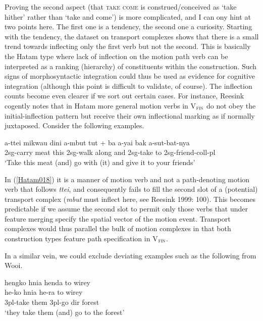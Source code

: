 Proving the second aspect (that \textsc{take} \textsc{come} is construed/conceived as `take hither' rather than `take and come') is more complicated, and I can ony hint at two points here. The first one is a tendency, the second one a curiosity. Starting with the tendency, the dataset on transport complexes shows that there is a small trend towards inflecting only the first verb but not the second. This is basically the Hatam type where lack of inflection on the motion path verb can be interpreted as a ranking (hierarchy) of constituents within the construction. Such signs of morphosyntactic integration could thus be used as evidence for cognitive integration (although this point is difficult to validate, of course). The inflection counts become even clearer if we sort out certain cases. For instance, Reesink cogently notes that in Hatam more general motion verbs in V$_{\textsc{fin}}$ do not obey the initial-inflection pattern but receive their own inflectional marking as if normally juxtaposed. Consider the following examples.

\ea \label{Hatam018}
\gll a-ttei mikwau dini a-mbut tut + ba a-yai bak a-sut-bat-nya \\
\acs{2}\acs{sg}-carry meat this \acs{2}\acs{sg}-walk along and \acs{2}\acs{sg}-take to \acs{2}\acs{sg}-friend-\acs{coll}-\acs{pl} \\
\glft `Take this meat (and) go with (it) and give it to your friends' \\ 
\z
\xe

In (\ref{Hatam018}) it is a manner of motion verb and not a path-denoting motion verb that follows \textit{ttei}, and consequently fails to fill the second slot of a (potential) transport complex (\textit{mbut} must inflect here, see Reesink 1999: 100). This becomes predictable if we assume the second slot to permit only those verbs that under feature merging specify the spatial vector of the motion event. Transport complexes would thus parallel the bulk of motion complexes in that both construction types feature path specification in V$_{\textsc{fin}}$. 

In a similar vein, we could exclude deviating examples such as the following from Wooi.

\ea \label{Wooi137}
\gll hengko hnia henda to wirey \\
he-ko hnia he-ra to wirey \\
\glc \acs{3}\acs{pl}-take them \acs{3}\acs{pl}-go \acs{dir} forest \\
\glft `they take them (and) go to the forest' \\ 
\z
\xe

